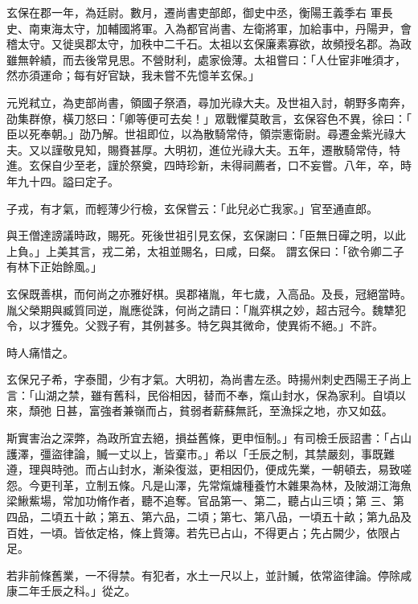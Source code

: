 \begin{pinyinscope}
 玄保在郡一年，為廷尉。數月，遷尚書吏部郎，御史中丞，衡陽王義季右
 軍長史、南東海太守，加輔國將軍。入為都官尚書、左衛將軍，加給事中，丹陽尹，會稽太守。又徙吳郡太守，加秩中二千石。太祖以玄保廉素寡欲，故頻授名郡。為政雖無幹績，而去後常見思。不營財利，處家儉薄。太祖嘗曰：「人仕宦非唯須才，然亦須運命；每有好官缺，我未嘗不先憶羊玄保。」



 元兇弒立，為吏部尚書，領國子祭酒，尋加光祿大夫。及世祖入討，朝野多南奔，劭集群僚，橫刀怒曰：「卿等便可去矣！」眾戰懼莫敢言，玄保容色不異，徐曰：「
 臣以死奉朝。」劭乃解。世祖即位，以為散騎常侍，領崇憲衛尉。尋遷金紫光祿大夫。又以謹敬見知，賜賚甚厚。大明初，進位光祿大夫。五年，遷散騎常侍，特進。玄保自少至老，謹於祭奠，四時珍新，未得祠薦者，口不妄嘗。八年，卒，時年九十四。謚曰定子。



 子戎，有才氣，而輕薄少行檢，玄保嘗云：「此兒必亡我家。」官至通直郎。



 與王僧達謗議時政，賜死。死後世祖引見玄保，玄保謝曰：「臣無日磾之明，以此上負。」上美其言，戎二弟，太祖並賜名，曰咸，曰粲。
 謂玄保曰：「欲令卿二子有林下正始餘風。」



 玄保既善棋，而何尚之亦雅好棋。吳郡褚胤，年七歲，入高品。及長，冠絕當時。胤父榮期與臧質同逆，胤應從誅，何尚之請曰：「胤弈棋之妙，超古冠今。魏犨犯令，以才獲免。父戮子宥，其例甚多。特乞與其微命，使異術不絕。」不許。



 時人痛惜之。



 玄保兄子希，字泰聞，少有才氣。大明初，為尚書左丞。時揚州刺史西陽王子尚上言：「山湖之禁，雖有舊科，民俗相因，替而不奉，熂山封水，保為家利。自頃以來，頹弛
 日甚，富強者兼嶺而占，貧弱者薪蘇無託，至漁採之地，亦又如茲。



 斯實害治之深弊，為政所宜去絕，損益舊條，更申恒制。」有司檢壬辰詔書：「占山護澤，彊盜律論，贓一丈以上，皆棄市。」希以「壬辰之制，其禁嚴刻，事既難遵，理與時弛。而占山封水，漸染復滋，更相因仍，便成先業，一朝頓去，易致嗟怨。今更刊革，立制五條。凡是山澤，先常熂爈種養竹木雜果為林，及陂湖江海魚梁鰍鮆場，常加功脩作者，聽不追奪。官品第一、第二，聽占山三頃；第
 三、第四品，二頃五十畝；第五、第六品，二頃；第七、第八品，一頃五十畝；第九品及百姓，一頃。皆依定格，條上貲簿。若先已占山，不得更占；先占闕少，依限占足。



 若非前條舊業，一不得禁。有犯者，水土一尺以上，並計贓，依常盜律論。停除咸康二年壬辰之科。」從之。




\end{pinyinscope}
